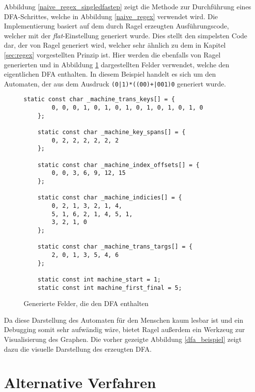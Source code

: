  Abbildung \ref{naive_regex_singledfastep} zeigt die Methode zur Durchführung eines DFA-Schrittes, welche in Abbildung \ref{naive_regex} verwendet wird.
 Die Implementierung basiert auf dem durch Ragel erzeugten Ausführungscode, welcher mit der \emph{flat}-Einstellung generiert wurde.
 Dies stellt den simpelsten Code dar, der von Ragel generiert wird, welcher sehr ähnlich zu dem in Kapitel \ref{sec:regex} vorgestellten Prinzip ist.
 Hier werden die ebenfalls von Ragel generierten und in Abbildung \ref{naive_regex_felder} dargestellten Felder verwendet, welche den eigentlichen DFA enthalten.
 In diesem Beispiel handelt es sich um den Automaten, der aus dem Ausdruck \texttt{(0|1)*((00)+|001)0} generiert wurde.
 
 \begin{figure}[ht]
	 \begin{lstlisting}[language=MyC++]
	static const char _machine_trans_keys[] = {
		0, 0, 0, 1, 0, 1, 0, 1, 0, 1, 0, 1, 0, 1, 0
	};
	
	static const char _machine_key_spans[] = {
		0, 2, 2, 2, 2, 2, 2
	};
	
	static const char _machine_index_offsets[] = {
		0, 0, 3, 6, 9, 12, 15
	};
	
	static const char _machine_indicies[] = {
		0, 2, 1, 3, 2, 1, 4, 
		5, 1, 6, 2, 1, 4, 5, 1, 
		3, 2, 1, 0
	};
	
	static const char _machine_trans_targs[] = {
		2, 0, 1, 3, 5, 4, 6
	};
	
	static const int machine_start = 1;
	static const int machine_first_final = 5;
	\end{lstlisting}
	\caption{Generierte Felder, die den DFA enthalten}
	\label{naive_regex_felder}
\end{figure}
 
Da diese Darstellung des Automaten für den Menschen kaum lesbar ist und ein Debugging somit sehr aufwändig wäre, bietet Ragel außerdem ein Werkzeug zur Visualisierung des Graphen.
Die vorher gezeigte Abbildung \ref{dfa_beispiel} zeigt dazu die visuelle Darstellung des erzeugten DFA.

\section{Alternative Verfahren}
\label{sec:regex_alternativen}

